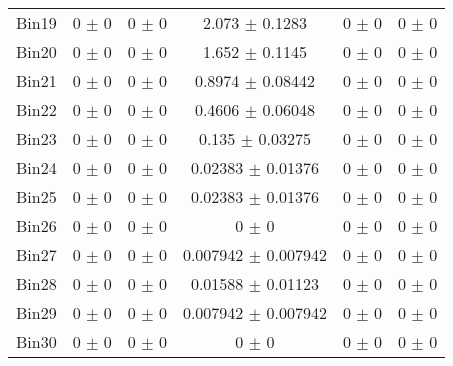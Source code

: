 \begin{tabular}{@{\extracolsep{4pt}}lccccc@{}}
     Bin19 & 0 $\pm$ 0 & 0 $\pm$ 0 & 2.073 $\pm$ 0.1283 & 0 $\pm$ 0 & 0 $\pm$ 0 \\ 
     Bin20 & 0 $\pm$ 0 & 0 $\pm$ 0 & 1.652 $\pm$ 0.1145 & 0 $\pm$ 0 & 0 $\pm$ 0 \\ 
     Bin21 & 0 $\pm$ 0 & 0 $\pm$ 0 & 0.8974 $\pm$ 0.08442 & 0 $\pm$ 0 & 0 $\pm$ 0 \\ 
     Bin22 & 0 $\pm$ 0 & 0 $\pm$ 0 & 0.4606 $\pm$ 0.06048 & 0 $\pm$ 0 & 0 $\pm$ 0 \\ 
     Bin23 & 0 $\pm$ 0 & 0 $\pm$ 0 & 0.135 $\pm$ 0.03275 & 0 $\pm$ 0 & 0 $\pm$ 0 \\ 
     Bin24 & 0 $\pm$ 0 & 0 $\pm$ 0 & 0.02383 $\pm$ 0.01376 & 0 $\pm$ 0 & 0 $\pm$ 0 \\ 
     Bin25 & 0 $\pm$ 0 & 0 $\pm$ 0 & 0.02383 $\pm$ 0.01376 & 0 $\pm$ 0 & 0 $\pm$ 0 \\ 
     Bin26 & 0 $\pm$ 0 & 0 $\pm$ 0 & 0 $\pm$ 0 & 0 $\pm$ 0 & 0 $\pm$ 0 \\ 
     Bin27 & 0 $\pm$ 0 & 0 $\pm$ 0 & 0.007942 $\pm$ 0.007942 & 0 $\pm$ 0 & 0 $\pm$ 0 \\ 
     Bin28 & 0 $\pm$ 0 & 0 $\pm$ 0 & 0.01588 $\pm$ 0.01123 & 0 $\pm$ 0 & 0 $\pm$ 0 \\ 
     Bin29 & 0 $\pm$ 0 & 0 $\pm$ 0 & 0.007942 $\pm$ 0.007942 & 0 $\pm$ 0 & 0 $\pm$ 0 \\ 
     Bin30 & 0 $\pm$ 0 & 0 $\pm$ 0 & 0 $\pm$ 0 & 0 $\pm$ 0 & 0 $\pm$ 0 \\ 
\hline\hline
  \end{tabular}
